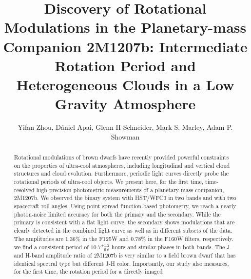 \documentclass[apj]{emulateapj}
\newcommand{\reviseTwo}[1]{\textbf{{\color{cyan}{#1}}}}
\newcommand{\period}{$10.7^{+1.2}_{-0.6}$}
\begin{document}
\title{Discovery of Rotational Modulations in the Planetary-mass
  Companion 2M1207\lowercase{b}: Intermediate Rotation Period and Heterogeneous Clouds in a Low
  Gravity Atmosphere}
\author{Yifan Zhou, D\'aniel Apai,
  Glenn H Schneider,  Mark S. Marley,
  Adam P. Showman}


\begin{abstract}
  Rotational modulations of brown dwarfs have recently provided
  powerful constraints on the properties of ultra-cool atmospheres,
  including longitudinal and vertical cloud structures and cloud
  evolution. Furthermore, periodic light curves directly probe the
  rotational periods of ultra-cool objects.  We present here, for the
  first time, time-resolved high-precision photometric measurements of
  a planetary-mass companion, 2M1207b.  We observed the binary
  system with HST/WFC3 in two bands and with two spacecraft roll
  angles. Using point spread function-based photometry, we reach a
  nearly photon-noise limited accuracy for both the primary and the
  secondary. While the primary is consistent with a flat light curve,
  the secondary shows modulations that are clearly detected in the
  combined light curve as well as in different subsets of the data.
  The amplitudes are 1.36\% in the F125W and 0.78\% in the F160W
  filters, respectively.  \reviseTwo{By fitting sine waves to the
  light curves,} we find a consistent period of
\period{} hours and
  similar phases in both bands. The J- and H-band amplitude ratio of
  2M1207b is very similar to a field brown dwarf that has identical
  spectral type but different J-H color.  Importantly, our study also
  measures, for the first time, the rotation period for a directly 
  imaged \reviseTwo{extra-solar planetary-mass companion.}
\end{abstract}
\end{document}
